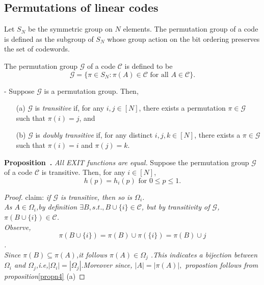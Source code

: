 \documentclass[
10pt, %
a4paper, %
oneside, %
headinclude,footinclude, %
BCOR5mm, %
]{scrartcl}
\newenvironment{proposition}[1][]{\refstepcounter{definition}\par\medskip
   \noindent \textbf{Proposition~\thedefinition. #1} \rmfamily}{\medskip}
\begin{document}
\subsection*{Permutations of linear codes} Let $S_N$ be the symmetric group on $N$ elements. The permutation group of a code is defined as the subgroup of $S_N$ whose group action on the bit ordering preserves the set of codewords.\\

\begin{definition}The permutation group $\mathcal{G}$ of a code $\mathcal{C}$ is defined to be $$\mathcal{G} = \{\pi \in S_N : \pi(A) \in \mathcal{C} \text{ for all } A \in \mathcal{C}\}.$$
\end{definition}

\begin{definition} - Suppose $\mathcal{G}$ is a permutation group. Then,
\begin{enumerate}
\item[(a)]$\mathcal{G}$ is \emph{transitive} if, for any $i,j \in [N]$, there exists a permutation $\pi \in \mathcal{G}$ such that $\pi(i)=j$, and
\item[(b)] $\mathcal{G}$ is \emph{doubly transitive} if, for any distinct $i,j,k \in [N]$, there exists a $\pi \in \mathcal{G}$ such that $\pi(i)=i$ and $\pi(j)=k$.
\end{enumerate}
\end{definition}

\begin{proposition}\emph{All EXIT functions are equal.}
Suppose the permutation group $\mathcal{G}$ of a code $\mathcal{C}$ is transitive. Then, for any $i \in [N]$, $$h(p) = h_i(p) \text{ for } 0 \le p\le 1.$$
\begin{proof}
claim:
\emph{if $\mathcal{G}$ is transitive, then so is $\Omega_i$.\\
As $ A\in\Omega_i$,by definition $\exists B ,s.t.,B\cup\{i\} \in \mathcal{C}$, but by transitivity of $\mathcal{G}$, $\pi(B\cup\{i\}) \in \mathcal{C}$.\\Observe,$$\pi(B\cup\{i\})=\pi(B)\cup\pi(\{i\})=\pi(B)\cup j$$.\\Since $\pi(B) \subseteq \pi(A)$,it follows $\pi(A) \in \Omega_j$ .This indicates a bijection between $\Omega_i$ and $\Omega_j$,i.e,$|\Omega_i|=|\Omega_j|$.Moreover since, $ |A| =|\pi(A)|,$ propostion follows from proposition}\ref{propn4} (a)
\end{proof}
\end{proposition}
\label{propn7}
\end{document}
